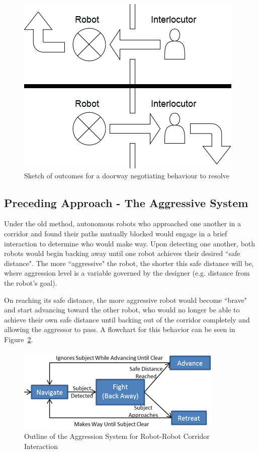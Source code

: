 \documentclass[letterpaper, 10 pt, conference]{ieeeconf}  %
\begin{document}
    \begin{figure}
      \centering
      \includegraphics{wireframe.png}
      \caption{Sketch of outcomes for a doorway negotiating behaviour to resolve}
      \label{fig:Wireframe}
   \end{figure}

\subsection{Preceding Approach - The Aggressive System}

Under the old method\cite{c1}, autonomous robots who approached one another in a corridor and found their paths mutually blocked would engage in a brief interaction to determine who would make way. Upon detecting one another, both robots would begin backing away until one robot achieves their desired ``safe distance". The more ``aggressive" the robot, the shorter this safe distance will be, where aggression level is a variable governed by the designer (e.g. distance from the robot’s goal).

On reaching its safe distance, the more aggressive robot would become ``brave" and start advancing toward the other robot, who would no longer be able to achieve their own safe distance until backing out of the corridor completely and allowing the aggressor to pass. A flowchart for this behavior can be seen in Figure~\ref{fig:Aggressive}.
 
    \begin{figure}
      \centering
      \includegraphics{aggressive_behavior.png}
      \caption{Outline of the Aggression System for Robot-Robot Corridor Interaction}
      \label{fig:Aggressive}
   \end{figure}
 
\end{document}
